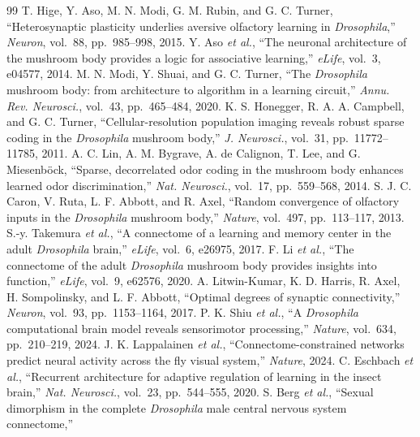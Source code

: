 \documentclass[conference]{IEEEtran}
\begin{document}
\begin{thebibliography}{99}
 T. Hige, Y. Aso, M. N. Modi, G. M. Rubin, and G. C. Turner,
``Heterosynaptic plasticity underlies aversive olfactory learning in
\textit{Drosophila},'' \textit{Neuron}, vol.~88, pp.~985--998, 2015.
 Y. Aso \textit{et al.}, ``The neuronal architecture of the
mushroom body provides a logic for associative learning,'' \textit{eLife},
vol.~3, e04577, 2014.
 M. N. Modi, Y. Shuai, and G. C. Turner, ``The
\textit{Drosophila} mushroom body: from architecture to algorithm in a
learning circuit,'' \textit{Annu. Rev. Neurosci.}, vol.~43, pp.~465--484, 2020.
 K. S. Honegger, R. A. A. Campbell, and G. C. Turner,
``Cellular-resolution population imaging reveals robust sparse coding in the
\textit{Drosophila} mushroom body,'' \textit{J. Neurosci.}, vol.~31,
pp.~11772--11785, 2011.
 A. C. Lin, A. M. Bygrave, A. de Calignon, T. Lee, and G.
Miesenb\"ock, ``Sparse, decorrelated odor coding in the mushroom body enhances
learned odor discrimination,'' \textit{Nat. Neurosci.}, vol.~17,
pp.~559--568, 2014.
 S. J. C. Caron, V. Ruta, L. F. Abbott, and R. Axel,
``Random convergence of olfactory inputs in the \textit{Drosophila} mushroom
body,'' \textit{Nature}, vol.~497, pp.~113--117, 2013.
 S.-y. Takemura \textit{et al.}, ``A connectome of a
learning and memory center in the adult \textit{Drosophila} brain,''
\textit{eLife}, vol.~6, e26975, 2017.
 F. Li \textit{et al.}, ``The connectome of the adult
\textit{Drosophila} mushroom body provides insights into function,''
\textit{eLife}, vol.~9, e62576, 2020.
 A. Litwin-Kumar, K. D. Harris, R. Axel, H.
Sompolinsky, and L. F. Abbott, ``Optimal degrees of synaptic connectivity,''
\textit{Neuron}, vol.~93, pp.~1153--1164, 2017.
 P. K. Shiu \textit{et al.}, ``A \textit{Drosophila}
computational brain model reveals sensorimotor processing,'' \textit{Nature},
vol.~634, pp.~210--219, 2024.
 J. K. Lappalainen \textit{et al.},
``Connectome-constrained networks predict neural activity across the fly visual
system,'' \textit{Nature}, 2024.
 C. Eschbach \textit{et al.}, ``Recurrent architecture
for adaptive regulation of learning in the insect brain,'' \textit{Nat.
Neurosci.}, vol.~23, pp.~544--555, 2020.
 S. Berg \textit{et al.}, ``Sexual dimorphism in the
complete \textit{Drosophila} male central nervous system connectome,''

\end{thebibliography}
\end{document}
